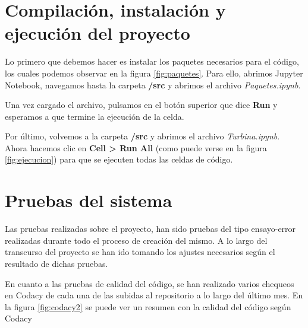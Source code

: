 \section{Compilación, instalación y ejecución del proyecto}
\label{compilacion}

Lo primero que debemos hacer es instalar los paquetes necesarios para el código, los cuales podemos observar en la figura \ref{fig:paquetes}. Para ello, abrimos Jupyter Notebook, navegamos hasta la carpeta \textbf{/src} y abrimos el archivo \textit{Paquetes.ipynb}.

\label{fig:paquetes}

Una vez cargado el archivo, pulsamos en el botón superior que dice \textbf{Run} y esperamos a que termine la ejecución de la celda.

Por último, volvemos a la carpeta \textbf{/src} y abrimos el archivo \textit{Turbina.ipynb}. Ahora hacemos clic en \textbf{Cell > Run All} (como puede verse en la figura \ref{fig:ejecucion}) para que se ejecuten todas las celdas de código.

\label{fig:ejecucion}


\section{Pruebas del sistema}

Las pruebas realizadas sobre el proyecto, han sido pruebas del tipo ensayo-error realizadas durante todo el proceso de creación del mismo. A lo largo del transcurso del proyecto se han ido tomando los ajustes necesarios según el resultado de dichas pruebas.

En cuanto a las pruebas de calidad del código, se han realizado varios chequeos en Codacy\cite{Codacy} de cada una de las subidas al repositorio a lo largo del último mes. En la figura \ref{fig:codacy2} se puede ver un resumen con la calidad del código según Codacy

\label{fig:codacy2}